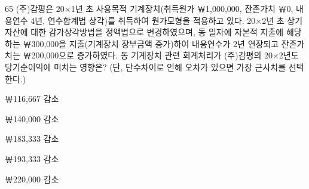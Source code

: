 \begin{question}{65}
(주)감평은 20×1년 초 사용목적 기계장치(취득원가 ￦1,000,000, 잔존가치 ￦0, 내용연수 4년, 연수합계법 상각)를 취득하여 원가모형을 적용하고 있다. 20×2년 초 상기 자산에 대한 감가상각방법을 정액법으로 변경하였으며, 동 일자에 자본적 지출에 해당하는 ￦300,000을 지출(기계장치 장부금액 증가)하여 내용연수가 2년 연장되고 잔존가치는 ￦200,000으로 증가하였다. 동 기계장치 관련 회계처리가 (주)감평의 20×2년도 당기순이익에 미치는 영향은? (단, 단수차이로 인해 오차가 있으면 가장 근사치를 선택한다.)
\begin{choices}
  \item ￦116,667 감소
  \item ￦140,000 감소
  \item ￦183,333 감소
  \item ￦193,333 감소
  \item ￦220,000 감소
\end{choices}
\end{question}

